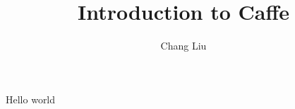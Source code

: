 \documentclass[10pt]{article}
\author{Chang Liu}
\title{Introduction to Caffe}
\begin{document}
\maketitle  %

Hello world
\end{document}
